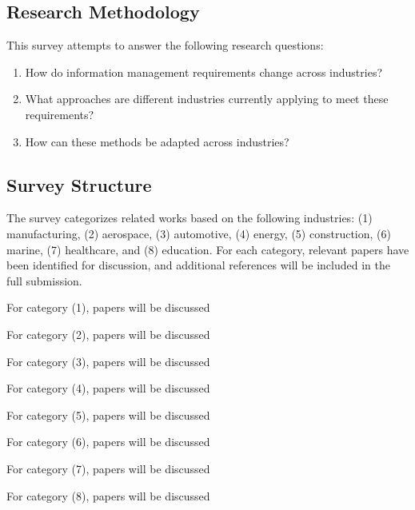 \documentclass[conference]{IEEEtran}
\begin{document}
\subsection{Research Methodology}
This survey attempts to answer the following research questions:

\begin{enumerate}
    \item How do information management requirements change across industries?
    \item What approaches are different industries currently applying to meet these requirements?
    \item How can these methods be adapted across industries?
\end{enumerate}

\subsection{Survey Structure}
The survey categorizes related works based on the following industries: (1) manufacturing, (2) aerospace, (3) automotive, (4) energy, (5) construction, (6) marine, (7) healthcare, and (8) education. For each category, relevant papers have been identified for discussion, and additional references will be included in the full submission.

For category (1), papers \cite{lam_bibliometric_2023} \cite{jyeniskhan_digital_2023} \cite{zhao_research_2023} \cite{chen_data_2023} will be discussed

For category (2), papers \cite{xiong_digital_2022} \cite{hua_leveraging_2023} \cite{diange_research_2022} will be discussed

For category (3), papers \cite{s_design_2023} \cite{xie_digital_2022} \cite{gross_transition_2023} will be discussed

For category (4), papers \cite{gu_digital_2022} \cite{zhifeng_distribution_2023} \cite{nwoke_fpga-based_2023} \cite{qiao_research_2023} will be discussed

For category (5), papers \cite{sabri_designing_2023} \cite{xinying_digital_2023} \cite{furuta_web-based_2023} will be discussed

For category (6), papers \cite{bartolucci_digital_2022} \cite{lv_digital_2023} will be discussed

For category (7), papers \cite{shrivastava_review_2023} \cite{viceconti_position_2024} \cite{pirbhulal_towards_2022} will be discussed

For category (8), papers \cite{tabunshchyk_digital_2023} \cite{fashal_review_2023} will be discussed
\end{document}
